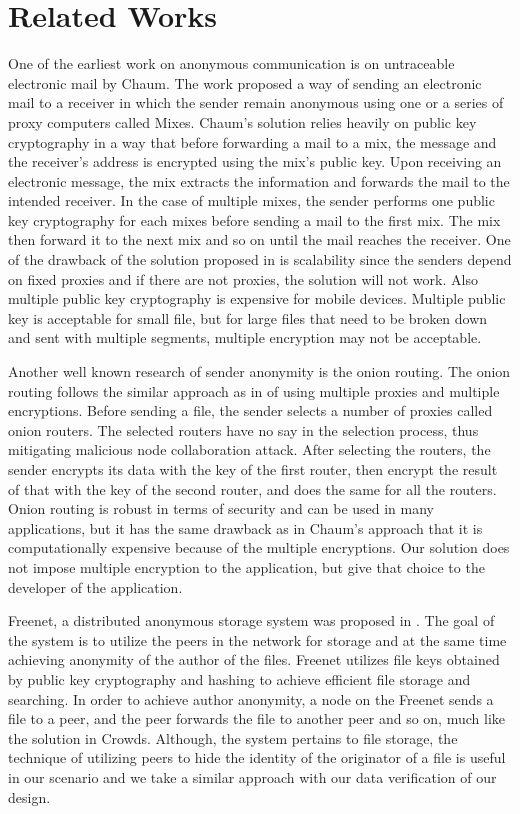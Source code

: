 \section{Related Works}\label{sec-related-works}
One of the earliest work on anonymous communication is on untraceable
electronic mail by Chaum\cite{DBLP:journals/cacm/Chaum81}. The work proposed
a way of sending an electronic mail to a receiver in which the sender
remain anonymous using one or a series of proxy computers called Mixes.
Chaum's solution relies heavily on public key cryptography in a way that
before forwarding a mail to a mix, the message and the receiver's address
is encrypted using the mix's public key. Upon receiving an electronic
message, the mix extracts the information
and forwards the mail to the intended receiver. In the case of multiple
mixes, the sender performs one public key cryptography for each mixes before
sending a mail to the first mix. The mix then forward it to the next mix
and so on until the mail reaches the receiver. One of the drawback of the
solution proposed in \cite{DBLP:journals/cacm/Chaum81} is scalability since
the senders depend on fixed proxies and if there are not proxies, the
solution will not work. Also multiple public key cryptography is expensive
for mobile devices. Multiple public key is acceptable for small file, but
for large files that need to be broken down and sent with multiple segments,
multiple encryption may not be acceptable.

Another well known research of sender anonymity is the
onion routing\cite{DBLP:conf/uss/DingledineMS04}. The onion routing
follows the similar approach as in \cite{DBLP:journals/cacm/Chaum81} of
using multiple proxies and multiple encryptions. Before sending a file,
the sender selects a number of proxies called onion routers. The selected
routers have no say in the selection process, thus mitigating malicious
node collaboration attack. After selecting the routers, the sender
encrypts its data with the key of the first router, then encrypt the result
of that with the key of the second router, and does the same for all the
routers. Onion routing is robust in terms
of security and can be used in many applications, but it has the same
drawback as in Chaum's approach that it is computationally expensive
because of the multiple encryptions. Our solution does not impose multiple
encryption to the application, but give that choice to the developer
of the application.

Freenet, a distributed anonymous storage system was proposed
in \cite{DBLP:conf/diau/ClarkeSWH00}. The goal of the system is to utilize
the peers in the network for storage and at the same time achieving anonymity
of the author of the files. Freenet utilizes file keys obtained by public
key cryptography and hashing to achieve efficient file storage and searching.
In order to achieve author anonymity, a node on the Freenet sends a file
to a peer, and the peer forwards the file to another peer and so on, much
like the solution in Crowds. Although, the system pertains to file storage,
the technique of utilizing peers to hide the identity of the originator of
a file is useful in our scenario and we take a similar approach with our
data verification of our design.

